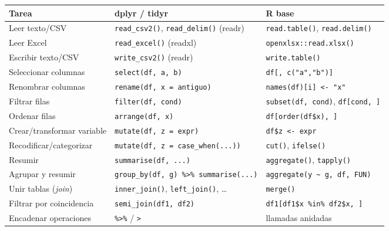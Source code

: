 \documentclass[
]{book}
\newcounter{none} %
\theoremstyle{break}
\theoremstyle{nonumberplain}
\begin{document}
{\def\LTcaptype{none} %
\begin{longtable}[]{@{}
  >{\raggedright\arraybackslash}p{}
  >{\raggedright\arraybackslash}p{}
  >{\raggedright\arraybackslash}p{}@{}}
\toprule\noalign{}
\begin{minipage}[b]{\linewidth}\raggedright
Tarea
\end{minipage} & \begin{minipage}[b]{\linewidth}\raggedright
dplyr / tidyr
\end{minipage} & \begin{minipage}[b]{\linewidth}\raggedright
R base
\end{minipage} \\
\midrule\noalign{}
\endhead
\bottomrule\noalign{}
\endlastfoot
Leer texto/CSV & \texttt{read\_csv2()}, \texttt{read\_delim()} (readr) & \texttt{read.table()}, \texttt{read.delim()} \\
Leer Excel & \texttt{read\_excel()} (readxl) & \texttt{openxlsx::read.xlsx()} \\
Escribir texto/CSV & \texttt{write\_csv2()} (readr) & \texttt{write.table()} \\
Seleccionar columnas & \texttt{select(df,\ a,\ b)} & \texttt{df{[},\ c("a","b"){]}} \\
Renombrar columnas & \texttt{rename(df,\ x\ =\ antiguo)} & \texttt{names(df){[}i{]}\ \textless{}-\ "x"} \\
Filtrar filas & \texttt{filter(df,\ cond)} & \texttt{subset(df,\ cond)}, \texttt{df{[}cond,\ {]}} \\
Ordenar filas & \texttt{arrange(df,\ x)} & \texttt{df{[}order(df\$x),\ {]}} \\
Crear/transformar variable & \texttt{mutate(df,\ z\ =\ expr)} & \texttt{df\$z\ \textless{}-\ expr} \\
Recodificar/categorizar & \texttt{mutate(df,\ z\ =\ case\_when(...))} & \texttt{cut()}, \texttt{ifelse()} \\
Resumir & \texttt{summarise(df,\ ...)} & \texttt{aggregate()}, \texttt{tapply()} \\
Agrupar y resumir & \texttt{group\_by(df,\ g)\ \%\textgreater{}\%\ summarise(...)} & \texttt{aggregate(y\ \textasciitilde{}\ g,\ df,\ FUN)} \\
Unir tablas (\emph{join}) & \texttt{inner\_join()}, \texttt{left\_join()}, \ldots{} & \texttt{merge()} \\
Filtrar por coincidencia & \texttt{semi\_join(df1,\ df2)} & \texttt{df1{[}df1\$x\ \%in\%\ df2\$x,\ {]}} \\
Encadenar operaciones & \texttt{\%\textgreater{}\%} / \texttt{\textbar{}\textgreater{}} & llamadas anidadas \\
\end{longtable}
}
\end{document}

